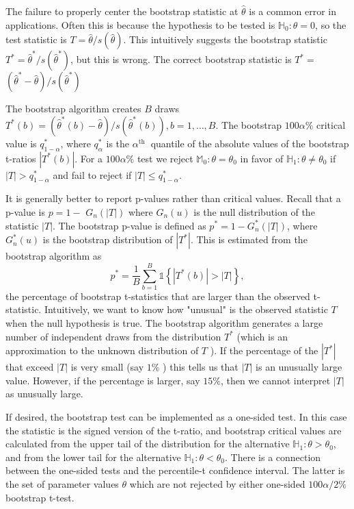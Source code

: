 \documentclass[10pt]{article}
\begin{document}
The failure to properly center the bootstrap statistic at $\widehat{\theta}$ is a common error in applications. Often this is because the hypothesis to be tested is $\mathbb{H}_{0}: \theta=0$, so the test statistic is $T=\widehat{\theta} / s(\widehat{\theta})$. This intuitively suggests the bootstrap statistic $T^{*}=\widehat{\theta}^{*} / s\left(\widehat{\theta}^{*}\right)$, but this is wrong. The correct bootstrap statistic is $T^{*}=$ $\left(\widehat{\theta}^{*}-\widehat{\theta}\right) / s\left(\widehat{\theta}^{*}\right)$

The bootstrap algorithm creates $B$ draws $T^{*}(b)=\left(\widehat{\theta}^{*}(b)-\widehat{\theta}\right) / s\left(\widehat{\theta}^{*}(b)\right), b=1, \ldots, B$. The bootstrap $100 \alpha \%$ critical value is $q_{1-\alpha}^{*}$, where $q_{\alpha}^{*}$ is the $\alpha^{\text {th }}$ quantile of the absolute values of the bootstrap t-ratios $\left|T^{*}(b)\right|$. For a $100 \alpha \%$ test we reject $\mathbb{M}_{0}: \theta=\theta_{0}$ in favor of $\mathbb{H}_{1}: \theta \neq \theta_{0}$ if $|T|>q_{1-\alpha}^{*}$ and fail to reject if $|T| \leq q_{1-\alpha}^{*}$.

It is generally better to report p-values rather than critical values. Recall that a p-value is $p=1-$ $G_{n}(|T|)$ where $G_{n}(u)$ is the null distribution of the statistic $|T|$. The bootstrap p-value is defined as $p^{*}=1-G_{n}^{*}(|T|)$, where $G_{n}^{*}(u)$ is the bootstrap distribution of $\left|T^{*}\right|$. This is estimated from the bootstrap algorithm as
$$
p^{*}=\frac{1}{B} \sum_{b=1}^{B} \mathbb{1}\left\{\left|T^{*}(b)\right|>|T|\right\},
$$
the percentage of bootstrap t-statistics that are larger than the observed t-statistic. Intuitively, we want to know how "unusual" is the observed statistic $T$ when the null hypothesis is true. The bootstrap algorithm generates a large number of independent draws from the distribution $T^{*}$ (which is an approximation to the unknown distribution of $T$ ). If the percentage of the $\left|T^{*}\right|$ that exceed $|T|$ is very small (say $1 \%$ ) this tells us that $|T|$ is an unusually large value. However, if the percentage is larger, say $15 \%$, then we cannot interpret $|T|$ as unusually large.

If desired, the bootstrap test can be implemented as a one-sided test. In this case the statistic is the signed version of the t-ratio, and bootstrap critical values are calculated from the upper tail of the distribution for the alternative $\mathbb{H}_{1}: \theta>\theta_{0}$, and from the lower tail for the alternative $\mathbb{H}_{1}: \theta<\theta_{0}$. There is a connection between the one-sided tests and the percentile-t confidence interval. The latter is the set of parameter values $\theta$ which are not rejected by either one-sided $100 \alpha / 2 \%$ bootstrap t-test.
\end{document}
